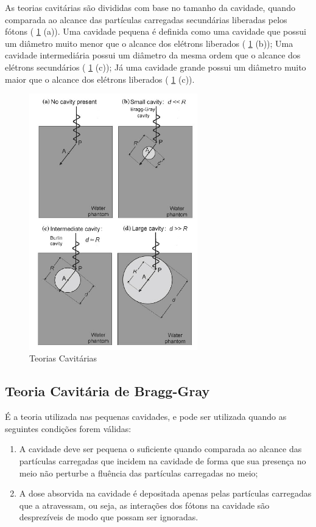 \documentclass[11pt,a4paper]{article}
\begin{document}
		As teorias cavitárias são divididas com base no tamanho da cavidade, quando comparada ao alcance das partículas carregadas secundárias liberadas pelos fótons (  \ref{fig:teoriasDasCavidades} (a)). Uma cavidade pequena é definida como uma cavidade que possui um diâmetro muito menor que o alcance dos elétrons liberados (  \ref{fig:teoriasDasCavidades} (b)); Uma cavidade intermediária possui um diâmetro da mesma ordem que o alcance dos elétrons secundários (  \ref{fig:teoriasDasCavidades} (c)); Já uma cavidade grande possui um diâmetro muito maior que o alcance dos elétrons liberados (  \ref{fig:teoriasDasCavidades} (c)). 

		\begin{figure}[h]
			\centering
			\includegraphics[width=0.65\textwidth]{Imagens/teoriasDasCavidades.jpg}
			\caption{Teorias Cavitárias}
			\label{fig:teoriasDasCavidades}
		\end{figure}

		
		\subsection{Teoria Cavitária de Bragg-Gray}

			É a teoria utilizada nas pequenas cavidades, e pode ser utilizada quando as seguintes condições forem válidas:

			\begin{enumerate}
				\item A cavidade deve ser pequena o suficiente quando comparada ao alcance das partículas carregadas que incidem na cavidade de forma que sua presença no meio não perturbe a fluência das partículas carregadas no meio;\label{cond:cav1}
				\item A dose absorvida na cavidade é depositada apenas pelas partículas carregadas que a atravessam, ou seja, as interações dos fótons na cavidade são desprezíveis de modo que possam ser ignoradas.\label{cond:cav2}
			\end{enumerate}
\end{document}
